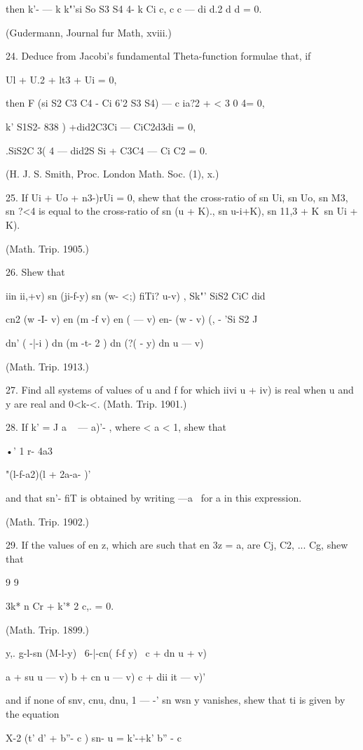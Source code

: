 then k'- — k k"'si So S3 S4 4- k Ci c, c c — di d.2 d d = 0.

(Gudermann, Journal fur Math, xviii.)

24. Deduce from Jacobi's fundamental Theta-function formulae that, if

Ul + U.2 + lt3 + Ui = 0,

then F (si S2 C3 C4 - Ci 6'2 S3 S4) — c ia?2 + < 3 0 4= 0,

k' S1S2- 838 ) +did2C3Ci — CiC2d3di = 0,

.SiS2C 3( 4 — did2S Si + C3C4 — Ci C2 = 0.

(H. J. S. Smith, Proc. London Math. Soc. (1), x.)

25. If Ui + Uo + n3-)rUi = 0, shew that the cross-ratio of sn Ui, sn
Uo, sn M3, sn ?<4 is equal to the cross-ratio of sn (u + K)., sn
u-i+K), sn 11,3 + K\ sn Ui + K).

(Math. Trip. 1905.)

26. Shew that

iin ii,+v) sn (ji-f-y) sn (w- <;) fiTi? u-v) , Sk"' SiS2 CiC did

cn2 (w -I- v) en (m -f v) en ( — v) en- (w - v) (, - 'Si S2 J

dn' ( -|-i ) dn (m -t- 2 ) dn (?( - y) dn u — v)

(Math. Trip. 1913.)

27. Find all systems of values of u and f for which iivi u + iv) is
real when u and y are real and 0<k-<. (Math. Trip. 1901.)

28. If k' = J a ~ — a)'- , where < a < 1, shew that

•' 1 r- 4a3

 "(l-f-a2)(l + 2a-a- )'

and that sn'- fiT is obtained by writing —a~ for a in this expression.

(Math. Trip. 1902.)

29. If the values of en z, which are such that en 3z = a, are Cj, C2,
... Cg, shew that

9 9

3k* n Cr + k'* 2 c,. = 0.

(Math. Trip. 1899.)

y,. g-l-sn (M-l-y) \ 6-|-cn( f-f y) \ c + dn u + v)

a + su u — v) b + cn u — v) c + dii it — v)'

and if none of snv, cnu, dnu, 1 — -' sn wsn y vanishes, shew that ti
is given by the equation

X-2 (t' d' + b''- c ) sn- u = k'-+k' b'' - c\

